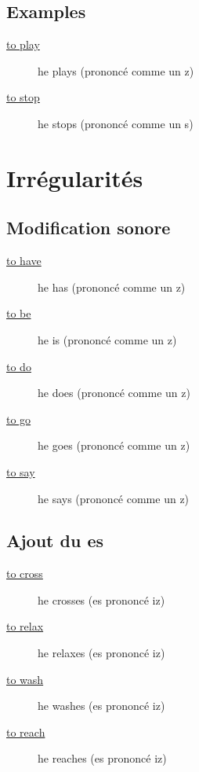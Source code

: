 \documentclass[12pt,4]{article}
\begin{document}
\subsection{Examples}
\label{sec:org4c61b95}
\begin{description}
\item[{\href{https://fr.bab.la/conjugaison/anglais/play}{to play}}] he plays (prononcé comme un z)
\item[{\href{https://fr.bab.la/conjugaison/anglais/stop}{to stop}}] he stops (prononcé comme un s)
\end{description}
\section{Irrégularités}
\label{sec:orga23384d}
\subsection{Modification sonore}
\label{sec:org2823a0d}
\begin{description}
\item[{\href{https://fr.bab.la/conjugaison/anglais/have}{to have}}] he has (prononcé comme un z)
\item[{\href{https://fr.bab.la/conjugaison/anglais/be}{to be}}] he is (prononcé comme un z)
\item[{\href{https://fr.bab.la/conjugaison/anglais/do}{to do}}] he does (prononcé comme un z)
\item[{\href{https://fr.bab.la/conjugaison/anglais/go}{to go}}] he goes (prononcé comme un z)
\item[{\href{https://fr.bab.la/conjugaison/anglais/say}{to say}}] he says (prononcé comme un z)
\end{description}
\subsection{Ajout du es}
\label{sec:orgfd7621c}
\begin{description}
\item[{\href{https://fr.bab.la/conjugaison/anglais/cross}{to cross}}] he crosses (es prononcé iz)
\item[{\href{https://fr.bab.la/conjugaison/anglais/relax}{to relax}}] he relaxes (es prononcé iz)
\item[{\href{https://fr.bab.la/conjugaison/anglais/wash}{to wash}}] he washes (es prononcé iz)
\item[{\href{https://fr.bab.la/conjugaison/anglais/reach}{to reach}}] he reaches (es prononcé iz)
\end{description}
\end{document}
